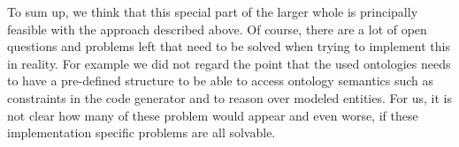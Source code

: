 \par
To sum up, we think that this special part of the larger whole is principally feasible with the approach described above. Of course, there are a lot of open questions and problems left that need to be solved when trying to implement this in reality. For example we did not regard the point that the used ontologies needs to have a pre-defined structure to be able to access ontology semantics such as constraints in the code generator and to reason over modeled entities. For us, it is not clear how many of these problem would appear and even worse, if these implementation specific problems are all solvable. 

























